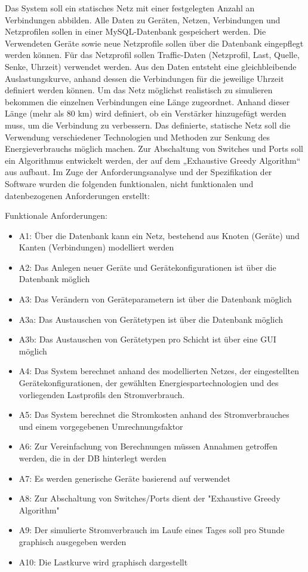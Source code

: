 Das System soll ein statisches Netz mit einer festgelegten Anzahl an Verbindungen abbilden. Alle Daten zu Geräten, Netzen, Verbindungen und Netzprofilen sollen in einer MySQL-Datenbank gespeichert werden. Die Verwendeten Geräte sowie neue Netzprofile sollen über die Datenbank eingepflegt werden können. Für das Netzprofil sollen Traffic-Daten (Netzprofil, Last, Quelle, Senke, Uhrzeit) verwendet werden. Aus den Daten entsteht eine gleichbleibende Auslastungskurve, anhand dessen die Verbindungen für die jeweilige Uhrzeit definiert werden können. Um das Netz möglichst realistisch zu simulieren bekommen die einzelnen Verbindungen eine Länge zugeordnet. Anhand dieser Länge (mehr als 80 km) wird definiert, ob ein Verstärker hinzugefügt werden muss, um die Verbindung zu verbessern. Das definierte, statische Netz soll die Verwendung verschiedener Technologien und Methoden zur Senkung des Energieverbrauchs möglich machen. Zur Abschaltung von Switches und Ports soll ein Algorithmus entwickelt werden, der auf dem „Exhaustive Greedy Algorithm“ aus \cite{fisher} aufbaut.
Im Zuge der Anforderungsanalyse und der Spezifikation der Software wurden die folgenden funktionalen, nicht funktionalen und datenbezogenen Anforderungen erstellt:



Funktionale Anforderungen:
\begin{itemize}
	\item A1: Über die Datenbank kann ein Netz, bestehend aus Knoten (Geräte) und Kanten (Verbindungen) modelliert werden
	\item A2: Das Anlegen neuer Geräte und Geräte\-konfi\-gura\-tionen ist über die Datenbank möglich
	\item A3: Das Verändern von Geräte\-parametern ist über die Datenbank möglich
	\item A3a: Das Austauschen von Geräte\-typen ist über die Datenbank möglich
	\item A3b: Das Austauschen von Geräte\-typen pro Schicht ist über eine GUI möglich                       
	\item A4: Das System berechnet anhand des modellierten Netzes, der eingestellten	Geräte\-konfi\-gura\-tionen, der gewählten Energiespartechnologien und des vorliegenden Lastprofils den Stromverbrauch.
	\item A5: Das System berechnet die Stromkosten anhand des Stromverbrauches und einem vorgegebenen Umrechnungsfaktor 
	\item A6: Zur Vereinfachung von Berechnungen müssen Annahmen getroffen werden, die in der DB hinterlegt werden
	\item A7: Es werden generische Geräte basierend auf \cite{vanhsheet} verwendet
	\item A8: Zur Abschaltung von Switches/Ports dient der "Exhaustive Greedy Algorithm"
	\item A9: Der simulierte Stromverbrauch im Laufe eines Tages soll pro Stunde graphisch ausgegeben werden
	\item A10: Die Lastkurve wird graphisch dargestellt
\end{itemize}


